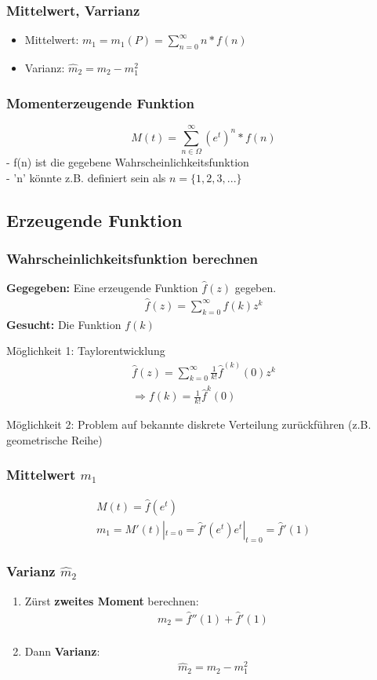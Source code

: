 \documentclass{article}
\begin{document}
\subsubsection{Mittelwert, Varrianz}
\begin{itemize}
	\item Mittelwert: $m_1 = m_1(P) = \sum_{n=0}^\infty n*f(n)$
	\item Varianz: $\widehat{m}_2 = m_2 - m_1^2$
\end{itemize}
\subsubsection{Momenterzeugende Funktion}
\[
	M(t)=\sum_{n\in\Omega}^{\infty}(e^t)^n * f(n)
\]
- f(n) ist die gegebene Wahrscheinlichkeitsfunktion\\
- 'n' k\"onnte z.B. definiert sein als $n=\{1,2,3,...\}$
\subsection{Erzeugende Funktion}
\subsubsection{Wahrscheinlichkeitsfunktion berechnen}
\textbf{Gegegeben:} Eine erzeugende Funktion $\hat{f}(z)$ gegeben.
\begin{align}
	\hat{f}(z) = \sum^{\infty}_{k=0} f(k)z^k
\end{align}
\textbf{Gesucht:} Die Funktion $f(k)$

M\"oglichkeit 1: Taylorentwicklung
\begin{align}
	\hat{f}(z) = \sum_{k=0}^{\infty} \frac{1}{k!}\hat{f}^{(k)}(0)z^k\\
	\Rightarrow f(k) = \frac{1}{k!} \hat{f}^{k}(0)
\end{align}

M\"oglichkeit 2: Problem auf bekannte diskrete Verteilung zur\"uckf\"uhren (z.B. geometrische
Reihe)
\subsubsection{Mittelwert $m_1$}
\begin{align}
	M(t) = \hat{f}(e^t)\\
	m_1  = M'(t)|_{t=0} = \hat{f}'(e^t)e^t|_{t=0} = \hat{f}'(1)
\end{align}
\subsubsection{Varianz $\hat{m}_2$}
\begin{enumerate}
	\item Z\"urst \textbf{zweites Moment} berechnen:
			\begin{align}
				m_2 = \hat{f}''(1) + \hat{f}'(1)\\
			\end{align}
		\item Dann \textbf{Varianz}:
			\begin{align}
				\hat{m}_2 = m_2 - m_1^2
			\end{align}
\end{enumerate}
\end{document}
